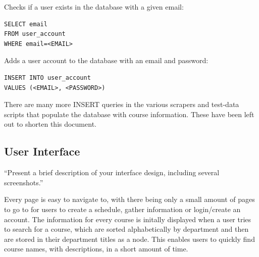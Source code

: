 \documentclass[twoside=false,a4paper,11pt]{article}
\theoremstyle{mytheor}
\begin{document}
Checks if a user exists in the database with a given email:
\begin{lstlisting}
SELECT email
FROM user_account
WHERE email=<EMAIL>
\end{lstlisting}

Adds a user account to the database with an email and password:
\begin{lstlisting}
INSERT INTO user_account
VALUES (<EMAIL>, <PASSWORD>)
\end{lstlisting}

There are many more INSERT queries in the various scrapers and test-data scripts that populate the database with course information. These have been left out to shorten this document.

\subsection*{User Interface}

``Present a brief description of your interface design, including several screenshots.''

Every page is easy to navigate to, with there being only a small amount of pages to go to for users to create a schedule, gather information or login/create an account.  The information for every course is initally displayed when a user tries to search for a course, which are sorted alphabetically by department and then are stored in their department titles as a node. This enables users to quickly find course names, with descriptions, in a short amount of time.
\end{document}
